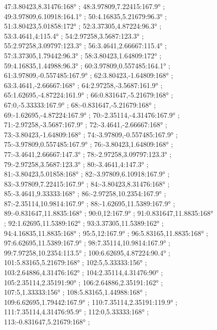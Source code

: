 \documentclass[a4paper,10pt,ngerman]{scrartcl}
\begin{document}
\begin{figure}[!h]
{            47:3.80423,8.31476:168° ;
            48:3.97809,7.22415:167.9° ;
            49:3.97809,6.10918:164.1° ;
            50:4.16835,5.21679:96.3° ;
            51:3.80423,5.01858:172° ;
            52:3.37305,4.87224:96.3° ;
            53:3.4641,4:115.4° ;
            54:2.97258,3.5687:123.3° ;
            55:2.97258,3.09797:123.3° ;
            56:3.4641,2.66667:115.4° ;
            57:3.37305,1.79442:96.3° ;
            58:3.80423,1.64809:172° ;
            59:4.16835,1.44988:96.3° ;
            60:3.97809,0.557485:164.1° ;
            61:3.97809,-0.557485:167.9° ;
            62:3.80423,-1.64809:168° ;
            63:3.4641,-2.66667:168° ;
            64:2.97258,-3.5687:161.9° ;
            65:1.62695,-4.87224:161.9° ;
            66:0.831647,-5.21679:168° ;
            67:0,-5.33333:167.9° ;
            68:-0.831647,-5.21679:168° ;
            69:-1.62695,-4.87224:167.9° ;
            70:-2.35114,-4.31476:167.9° ;
            71:-2.97258,-3.5687:167.9° ;
            72:-3.4641,-2.66667:168° ;
            73:-3.80423,-1.64809:168° ;
            74:-3.97809,-0.557485:167.9° ;
            75:-3.97809,0.557485:167.9° ;
            76:-3.80423,1.64809:168° ;
            77:-3.4641,2.66667:147.3° ;
            78:-2.97258,3.09797:123.3° ;
            79:-2.97258,3.5687:123.3° ;
            80:-3.4641,4:147.3° ;
            81:-3.80423,5.01858:168° ;
            82:-3.97809,6.10918:167.9° ;
            83:-3.97809,7.22415:167.9° ;
            84:-3.80423,8.31476:168° ;
            85:-3.4641,9.33333:168° ;
            86:-2.97258,10.2354:167.9° ;
            87:-2.35114,10.9814:167.9° ;
            88:-1.62695,11.5389:167.9° ;
            89:-0.831647,11.8835:168° ;
            90:0,12:167.9° ;
            91:0.831647,11.8835:168° ;
            92:1.62695,11.5389:162° ;
            93:3.37305,11.5389:162° ;
            94:4.16835,11.8835:168° ;
            95:5,12:167.9° ;
            96:5.83165,11.8835:168° ;
            97:6.62695,11.5389:167.9° ;
            98:7.35114,10.9814:167.9° ;
            99:7.97258,10.2354:113.5° ;
            100:6.62695,4.87224:90.4° ;
            101:5.83165,5.21679:168° ;
            102:5,5.33333:156° ;
            103:2.64886,4.31476:162° ;
            104:2.35114,4.31476:90° ;
            105:2.35114,2.35191:90° ;
            106:2.64886,2.35191:162° ;
            107:5,1.33333:156° ;
            108:5.83165,1.44988:168° ;
            109:6.62695,1.79442:167.9° ;
            110:7.35114,2.35191:119.9° ;
            111:7.35114,4.31476:95.9° ;
            112:0,5.33333:168° ;
            113:-0.831647,5.21679:168° ;
}
\end{figure}
\end{document}
